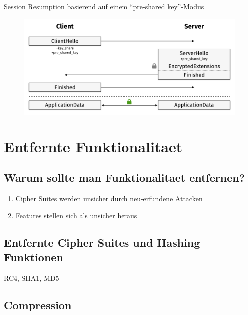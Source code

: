 \documentclass{f4_beamer_metropolis}
\begin{document}
\begin{frame}{Session Resumption basierend auf einem \enquote{pre-shared key}-Modus}
  \begin{figure}[!h]
    \centering
    \includegraphics[width=\linewidth]{./images/tls13-handshake-resumption.png}
    \label{fig:tls13-handshake-resumption}
    \autocite{taubert}
  \end{figure}
\end{frame}

\section{Entfernte Funktionalitaet}

\subsection{Warum sollte man Funktionalitaet entfernen?}

\begin{frame}
  \begin{enumerate}[<+->]
    \item Cipher Suites werden unsicher durch neu-erfundene Attacken
    \item Features stellen sich als unsicher heraus
    \end{enumerate}
\end{frame}

\subsection{Entfernte Cipher Suites und Hashing Funktionen}

\begin{frame}
RC4, SHA1, MD5
\end{frame}

\subsection{Compression}
\end{document}
